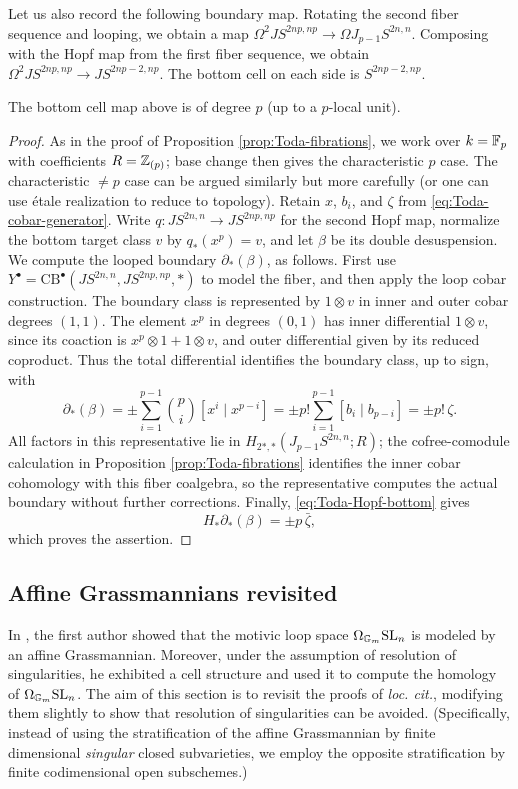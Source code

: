 \documentclass{amsart}
\numberwithin{proposition}{section}
\numberwithin{equation}{section}
\newcommand{\CB}{\mathrm{CB}}
\begin{document}
Let us also record the following boundary map.
Rotating the second fiber sequence and looping, we obtain a map $\Omega^2 JS^{2np,np} \to \Omega J_{p-1} S^{2n,n}$.
Composing with the Hopf map from the first fiber sequence, we obtain $\Omega^2 JS^{2np,np} \to JS^{2np-2,np}$.
The bottom cell on each side is $S^{2np-2,np}$.
\begin{lemma} \label{lem:boundary-p-map}
The bottom cell map above is of degree $p$ (up to a $p$-local unit).
\end{lemma}
\begin{proof}
As in the proof of Proposition \ref{prop:Toda-fibrations}, we work over $k=\mathbb{F}_p$ with coefficients $R=\mathbb{Z}_{(p)}$; base change then gives the characteristic $p$ case.
The characteristic $\ne p$ case can be argued similarly but more carefully (or one can use étale realization to reduce to topology).
Retain $x$, $b_i$, and $\zeta$ from \eqref{eq:Toda-cobar-generator}.
Write $q:JS^{2n,n}\to JS^{2np,np}$ for the second Hopf map, normalize the bottom target class $v$ by $q_*(x^p)=v$, and let $\beta$ be its double desuspension.
We compute the looped boundary $\partial_*(\beta)$, as follows.
First use $Y^\bullet=\CB^\bullet(JS^{2n,n},JS^{2np,np},*)$ to model the fiber, and then apply the loop cobar construction.
The boundary class is represented by $1\otimes v$ in inner and outer cobar degrees $(1,1)$.
The element $x^p$ in degrees $(0,1)$ has inner differential $1\otimes v$, since its coaction is $x^p\otimes1+1\otimes v$, and outer differential given by its reduced coproduct.
Thus the total differential identifies the boundary class, up to sign, with
\[
  \partial_*(\beta)
  =\pm\sum_{i=1}^{p-1}\binom pi[x^i\mid x^{p-i}]
  =\pm p!\sum_{i=1}^{p-1}[b_i\mid b_{p-i}]
  =\pm p!\,\zeta.
\]
All factors in this representative lie in $H_{2*,*}(J_{p-1}S^{2n,n};R)$; the cofree-comodule calculation in Proposition \ref{prop:Toda-fibrations} identifies the inner cobar cohomology with this fiber coalgebra, so the representative computes the actual boundary without further corrections.
Finally, \eqref{eq:Toda-Hopf-bottom} gives
\[
  H_*\partial_*(\beta)=\pm p\,\bar\zeta,
\]
which proves the assertion.
\end{proof}


\subsection{Affine Grassmannians revisited} \label{sec:grass}
In \cite{bachmann-grassmann}, the first author showed that the motivic loop space $\Omega_{\mathbb{G}_m} \mathrm{SL}_n$ is modeled by an affine Grassmannian.
Moreover, under the assumption of resolution of singularities, he exhibited a cell structure and used it to compute the homology of $\Omega_{\mathbb{G}_m} \mathrm{SL}_n$.
The aim of this section is to revisit the proofs of \emph{loc. cit.}, modifying them slightly to show that resolution of singularities can be avoided.
(Specifically, instead of using the stratification of the affine Grassmannian by finite dimensional \emph{singular} closed subvarieties, we employ the opposite stratification by finite codimensional open subschemes.)
\end{document}

